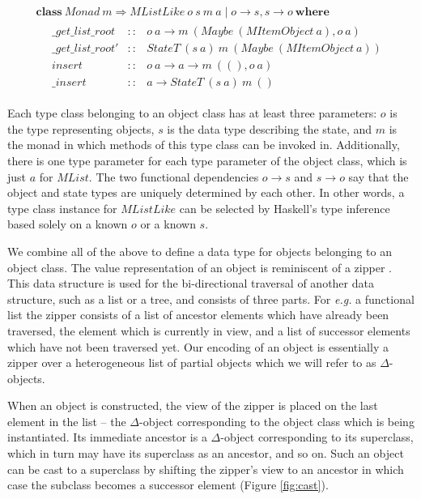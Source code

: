 \documentclass[runningheads,a4paper]{llncs}
\begin{document}
\begin{displaymath}
\begin{array}{l}
\mathbf{class}~\mathit{Monad}~m \Rightarrow \mathit{MListLike}~o~s~m~a \mid o \to s, s \to o~\mathbf{where} \\
\quad \begin{array}{lcl}
\_\mathit{get}\_\mathit{list}\_\mathit{root} & :: & o~a \to m~(\mathit{Maybe}~(\mathit{MItemObject~a}), o~a)\\
\_\mathit{get}\_\mathit{list}\_\mathit{root}' & :: & \mathit{StateT}~(s~a)~m~(\mathit{Maybe}~(\mathit{MItemObject}~a))\\
\mathit{insert} & :: & o~a \to a \to m~((),o~a) \\
\_\mathit{insert} & :: & a \to \mathit{StateT}~(s~a)~m~()
\end{array}
\end{array}
\end{displaymath}

Each type class belonging to an object class has at least three parameters: $o$ is the type representing objects, $s$ is the data type describing the state, and $m$ is the monad in which methods of this type class can be invoked in. Additionally, there is one type parameter for each type parameter of the object class, which is just $a$ for $\mathit{MList}$. The two functional dependencies $o \to s$ and $s \to o$ say that the object and state types are uniquely determined by each other. In other words, a type class instance for $\mathit{MListLike}$ can be selected by Haskell's type inference based solely on a known $o$ or a known $s$.

We combine all of the above to define a data type for objects belonging to an object class. The value representation of an object is reminiscent of a zipper \cite{huet1997zipper}. This data structure is used for the bi-directional traversal of another data structure, such as a list or a tree, and consists of three parts. For \emph{e.g.} a functional list the zipper consists of a list of ancestor elements which have already been traversed, the element which is currently in view, and a list of successor elements which have not been traversed yet. Our encoding of an object is essentially a zipper over a heterogeneous list of partial objects which we will refer to as $\Delta$-objects. 

When an object is constructed, the view of the zipper is placed on the last element in the list -- the $\Delta$-object corresponding to the object class which is being instantiated. Its immediate ancestor is a $\Delta$-object corresponding to its superclass, which in turn may have its superclass as an ancestor, and so on. Such an object can be cast to a superclass by shifting the zipper's view to an ancestor in which case the subclass becomes a successor element (Figure \ref{fig:cast}).
\end{document}

